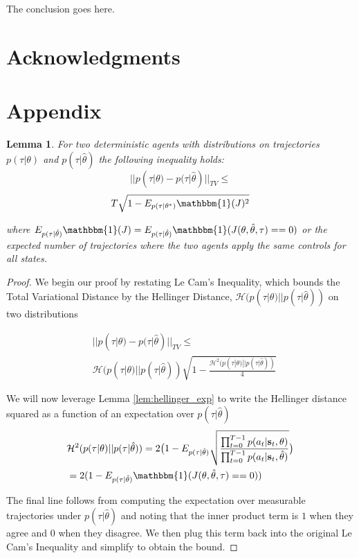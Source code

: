\documentclass[conference]{article}
\newcommand{\bs}{\mathbf{s}}
\newtheorem{lemma}[theorem]{Lemma}
\newtheorem{proof}[theorem]{proof}
\begin{document}
\label{sec:conclusion}

The conclusion goes here.

\section*{Acknowledgments}

\section*{Appendix}

\begin{lemma}
For two deterministic agents with distributions on trajectories $p(\tau|\theta)$ and $p(\tau|\hat{\theta})$ the following inequality holds:
$$||p(\tau|\theta) - p(\tau|\hat{\theta})||_{TV}  \leq$$ $$ T\sqrt{1 - E_{p(\tau|\theta^*)} \mathbbm{1}(J)^2} $$

where $E_{p(\tau|\hat{\theta})} \mathbbm{1}(J) =  E_{p(\tau|\hat{\theta})} \mathbbm{1}(J(\theta,\hat{\theta},\tau) == 0)$ or the expected number of trajectories where the two agents apply the same controls for all states. \\
\end{lemma}

\begin{proof}
We begin our proof by restating Le Cam's Inequality, which bounds the Total Variational Distance  by the Hellinger Distance, $\mathcal{H}(p(\tau|\theta) || p(\tau|\hat{\theta}))$ on two distributions

\begin{align}
&||p(\tau|\theta) - p(\tau|\hat{\theta})||_{TV} \leq \nonumber \\
&\mathcal{H}(p(\tau|\theta) || p(\tau|\hat{\theta}))\sqrt{1-\frac{\mathcal{H}^2(p(\tau|\theta) || p(\tau|\hat{\theta}))}{4}}\nonumber
\end{align}

We will now leverage Lemma \ref{lem:hellinger_exp} to write the Hellinger distance squared as a function of an expectation over $p(\tau|\hat{\theta})$
\begin{align}
&\mathcal{H}^2(p(\tau|\theta)||p(\tau|\hat{\theta})) = 2\big(1-E_{p(\tau|\hat{\theta})} \sqrt{\frac{\prod^{T-1}_{t=0} p(a_t|\bs_t,\theta)}{\prod^{T-1}_{t=0} p(a_t|\bs_t,\hat{\theta})}}\big) \nonumber \\
&= 2(1-E_{p(\tau|\hat{\theta})} \mathbbm{1}(J(\theta,\hat{\theta},\tau) == 0))
\end{align}


The final line follows from computing the expectation over measurable trajectories under $p(\tau|\hat{\theta})$ and noting that the inner product term is $1$ when they agree and $0$ when they disagree. We then plug this term back into the original Le Cam's Inequality and simplify to obtain the bound. 
\end{proof}
\end{document}
